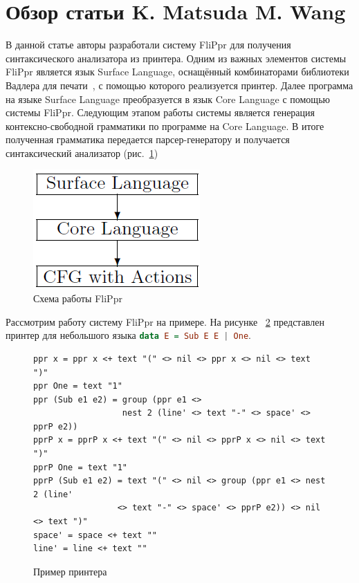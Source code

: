 \documentclass{matmex-diploma-custom}
\begin{document}
\section{Обзор статьи K. Matsuda M. Wang
}

В данной статье авторы разработали систему FliPpr для получения синтаксического анализатора из принтера. Одним из важных элементов системы FliPpr является язык Surface Language, оснащённый комбинаторами библиотеки Вадлера для печати~\cite{WadlerPrinter}, с помощью которого реализуется принтер. Далее программа на языке Surface Language преобразуется в язык Core Language с помощью системы FliPpr. Следующим этапом работы системы является генерация контексно-свободной грамматики по программе на Core Language. В итоге полученная грамматика передается парсер-генератору и получается синтаксический анализатор (рис.~\ref{схемаFliPpr})

\begin{figure}[h]
\centering
\includegraphics{FliPprScheme.png}
\caption{Схема работы FliPpr}
\label{схемаFliPpr}
\end{figure}



Рассмотрим работу систему FliPpr на примере. На рисунке ~\ref{Пример_принтера} представлен принтер для небольшого языка \lstinline[language=haskell,mathescape]{data E = Sub E E | One}.
\begin{figure}[h]
\centering
\begin{lstlisting}
ppr x = ppr x <+ text "(" <> nil <> ppr x <> nil <> text ")"
ppr One = text "1"
ppr (Sub e1 e2) = group (ppr e1 <> 
                  nest 2 (line' <> text "-" <> space' <> pprP e2))
pprP x = pprP x <+ text "(" <> nil <> pprP x <> nil <> text ")"
pprP One = text "1"
pprP (Sub e1 e2) = text "(" <> nil <> group (ppr e1 <> nest 2 (line'
                 <> text "-" <> space' <> pprP e2)) <> nil <> text ")"
space' = space <+ text ""
line' = line <+ text "" 
\end{lstlisting}
\caption{Пример принтера}
\label{Пример_принтера}
\end{figure}
\end{document}
